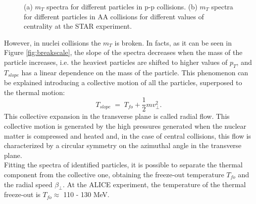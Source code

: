 \begin{figure}
  \centering
  \quad
  \caption{(a) $m_{T}$ spectra for different particles in p-p collisions. (b) $m_{T}$ spectra for different particles in AA collisions for different values of centrality at the STAR experiment.}
\end{figure}
%
However, in nuclei collisions the $m_{T}$ is broken. In facts, as it can be seen in Figure \ref{fig:breakscale}, the slope of the spectra decreases when the mass of the particle increases, i.e. the heaviest particles are shifted to higher values of $p_{T}$, and $T_{slope}$ has a linear dependence on the mass of the particle. This phenomenon can be explained introducing a collective motion of all the particles, superposed to the thermal motion:
\begin{equation}
 T_{slope}\;=\;T_{fo} + \frac{1}{2}mv_{\perp}^{2}.
\end{equation}
This collective expansion in the transverse plane is called radial flow. This collective motion is generated by the high pressures generated when the nuclear matter is compressed and heated and, in the case of central collisions, this flow is characterized by a circular symmetry on the azimuthal angle in the transverse plane.\\
Fitting the spectra of identified particles, it is possible to separate the thermal component from the collective one, obtaining the freeze-out temperature $T_{fo}$ and the radial speed $\beta_{\perp}$. At the ALICE experiment, the temperature of the thermal freeze-out is $T_{fo} \approx$ 110 - 130 MeV.\\
%
